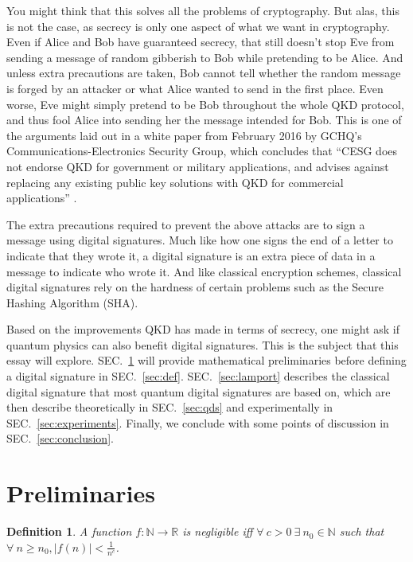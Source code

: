 \documentclass[%
 reprint,
 amsmath,amssymb,
 aps,
 pra,
]{revtex4-1}
\newtheorem{definition}{Definition}[section]
\begin{document}
You might think that this solves all the problems of cryptography. But alas, this is not the case, as secrecy is only one aspect of what we want in cryptography. Even if Alice and Bob have guaranteed secrecy, that still doesn't stop Eve from sending a message of random gibberish to Bob while pretending to be Alice. And unless extra precautions are taken, Bob cannot tell whether the random message is forged by an attacker or what Alice wanted to send in the first place. Even worse, Eve might simply pretend to be Bob throughout the whole QKD protocol, and thus fool Alice into sending her the message intended for Bob. This is one of the arguments laid out in a white paper from February 2016 by GCHQ's Communications-Electronics Security Group, which concludes that ``CESG does not endorse QKD for government or military applications, and advises against replacing any existing public key solutions with QKD for commercial applications'' \cite{CESG16}.

The extra precautions required to prevent the above attacks are to sign a message using digital signatures. Much like how one signs the end of a letter to indicate that they wrote it, a digital signature is an extra piece of data in a message to indicate who wrote it. And like classical encryption schemes, classical digital signatures rely on the hardness of certain problems such as the Secure Hashing Algorithm (SHA).

Based on the improvements QKD has made in terms of secrecy, one might ask if quantum physics can also benefit digital signatures. This is the subject that this essay will explore. SEC.\ \ref{sec:prelim} will provide mathematical preliminaries before defining a digital signature in SEC.\ \ref{sec:def}. SEC.\ \ref{sec:lamport} describes the classical digital signature that most quantum digital signatures are based on, which are then describe theoretically in SEC.\ \ref{sec:qds} and experimentally in SEC.\ \ref{sec:experiments}. Finally, we conclude with some points of discussion in SEC.\ \ref{sec:conclusion}.

\section{Preliminaries}
\label{sec:prelim}

\begin{definition}
A function $f:\mathbb{N}\rightarrow\mathbb{R}$ is negligible iff $\forall~ c > 0 ~\exists~ n_0 \in \mathbb{N}$ such that $\forall~ n \geq n_0, |f(n)| < \frac{1}{n^c}$.
\end{definition}
\end{document}
